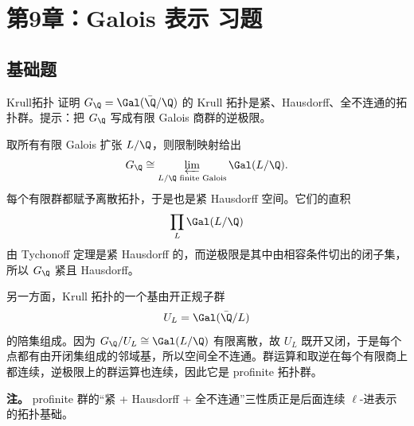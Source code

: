 \chapter{第9章：Galois 表示 习题}
\difficultykey

\section{基础题 \easy}

\begin{problem}{Krull拓扑}
证明 $G_\Q=\Gal(\bar\Q/\Q)$ 的 Krull 拓扑是紧、Hausdorff、全不连通的拓扑群。提示：把 $G_\Q$ 写成有限 Galois 商群的逆极限。
\end{problem}
\begin{solution}
取所有有限 Galois 扩张 $L/\Q$，则限制映射给出
\[
G_\Q\cong \varprojlim_{L/\Q\text{ finite Galois}} \Gal(L/\Q).
\]
每个有限群都赋予离散拓扑，于是也是紧 Hausdorff 空间。它们的直积
\[
\prod_L \Gal(L/\Q)
\]
由 Tychonoff 定理是紧 Hausdorff 的，而逆极限是其中由相容条件切出的闭子集，所以 $G_\Q$ 紧且 Hausdorff。

另一方面，Krull 拓扑的一个基由开正规子群
\[
U_L=\Gal(\bar\Q/L)
\]
的陪集组成。因为 $G_\Q/U_L\cong \Gal(L/\Q)$ 有限离散，故 $U_L$ 既开又闭，于是每个点都有由开闭集组成的邻域基，所以空间全不连通。群运算和取逆在每个有限商上都连续，逆极限上的群运算也连续，因此它是 profinite 拓扑群。

\textbf{注。} profinite 群的“紧 + Hausdorff + 全不连通”三性质正是后面连续 $\ell$-进表示的拓扑基础。
\end{solution}

